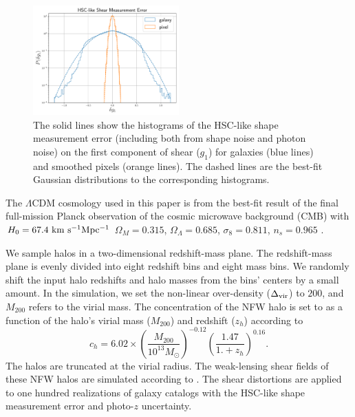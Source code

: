 \begin{figure}
 \centering
 \includegraphics[width=0.5\textwidth]{shapeMeasurementError-HSCY1.pdf}
 \caption{The solid lines show the histograms of the HSC-like shape measurement
     error (including both from shape noise and photon noise) on the first
     component of shear ($g_1$) for galaxies (blue lines) and smoothed pixels
     (orange lines). The dashed lines are the best-fit Gaussian distributions
     to the corresponding histograms.
    }
 \label{fig_noiseHistogram}
\end{figure}

The $\Lambda$CDM cosmology used in this paper is from the best-fit result of
the final full-mission Planck observation of the cosmic microwave background
(CMB) with $H_0=67.4 ~\rm{km~s^{-1} Mpc^{-1}}$ $\Omega_M=0.315$,
$\Omega_\Lambda=0.685$, $\sigma_8=0.811$, $n_s=0.965$
\citep{cmb-Planck2018-Cosmology}.

We sample halos in a two-dimensional redshift-mass plane. The redshift-mass
plane is evenly divided into eight redshift bins and eight mass bins. We
randomly shift the input halo redshifts and halo masses from the bins' centers
by a small amount. In the simulation, we set the non-linear over-density
($\Delta_{\rm{vir}}$) to $200$, and $M_{200}$ refers to the virial mass. The
concentration of the NFW halo is set to as a function of the halo's virial mass
($M_{200}$) and redshift ($z_{h}$) according to
\citet{c-M_Magneticum-Ragagnin2019}
\begin{equation}
c_{h}=6.02\times\left(\frac{M_{200}}{10^{13} M_{\odot}}\right)^{-0.12}
\left(\frac{1.47}{1.+z_h}\right)^{0.16}.
\end{equation}
The halos are truncated at the virial radius.
The weak-lensing shear fields of these NFW halos are simulated according to
\citet{haloModel-TJ2003-3pt}. The shear distortions are applied to one hundred
realizations of galaxy catalogs with the HSC-like shape measurement error and
photo-$z$ uncertainty.

